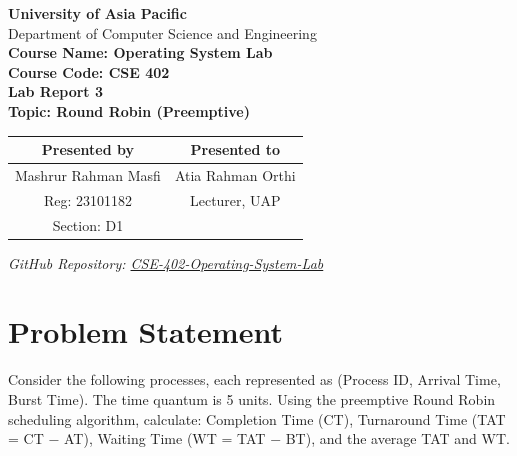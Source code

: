 \documentclass[12pt, a4paper]{article}
\begin{document}
\begin{center}
    \Large \textbf{University of Asia Pacific}\\
    \vspace{0.2cm}
    \large Department of Computer Science and Engineering\\
    \vspace{0.5cm}
    \textbf{\Large Course Name: Operating System Lab}\\
    \textbf{\large Course Code: CSE 402}\\
    \vspace{0.5cm}
    \textbf{\huge Lab Report 3}\\
    \vspace{0.3cm}
    \textbf{\large Topic: Round Robin (Preemptive)}\\
    \vspace{1cm}
\end{center}

\begin{table}[H]
    \centering
    \renewcommand{\arraystretch}{1.5}
    \begin{tabular}{cc}
        \textbf{Presented by} & \textbf{Presented to} \\
        \hline
        Mashrur Rahman Masfi & Atia Rahman Orthi \\
        Reg: 23101182 & Lecturer, UAP \\
        Section: D1 & \\
    \end{tabular}
\end{table}

\vfill
\begin{center}
    \textit{GitHub Repository: \href{https://github.com/MasfiRahman/CSE-402-Operating-System-Lab-.git}{CSE-402-Operating-System-Lab}}
\end{center}
\newpage

\section*{Problem Statement}
Consider the following processes, each represented as (Process ID, Arrival Time, Burst Time). The time quantum is 5 units. Using the preemptive Round Robin scheduling algorithm, calculate: Completion Time (CT), Turnaround Time (TAT = CT $-$ AT), Waiting Time (WT = TAT $-$ BT), and the average TAT and WT.
\end{document}
